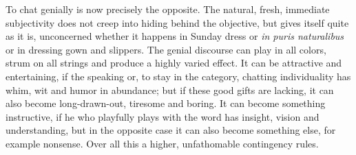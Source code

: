 \documentclass[12pt,a4paper,openany]{book}
\begin{document}
To chat genially is now precisely the opposite. The
natural, fresh, immediate subjectivity does not creep into
hiding behind the objective, but gives itself quite as
it is, unconcerned whether it happens in Sunday dress or
\textit{in puris naturalibus} or in dressing gown and slippers. The
genial discourse can play in all colors, strum on
all strings and produce a highly varied effect. It
can be attractive and entertaining, if the speaking
or, to stay in the category, chatting individuality
has whim, wit and humor in abundance; but if these
good gifts are lacking, it can also become long-drawn-out,
tiresome and boring. It can become something instructive,
if he who playfully plays with the word has
insight, vision and understanding, but in the opposite case it
can also become something else, for example nonsense. Over
all this a higher, unfathomable contingency rules.
\end{document}
